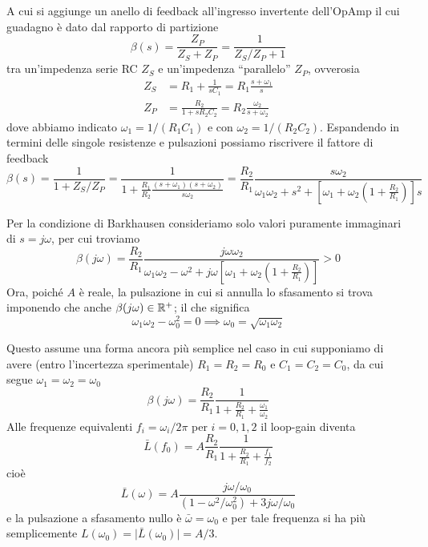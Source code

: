\documentclass[10pt, a4paper, italian]{article}
\begin{document}
A cui si aggiunge un anello di feedback all'ingresso invertente dell'OpAmp
il cui guadagno è dato dal rapporto di partizione
\begin{equation} \label{eq:loop-gain-beta}
\beta(s) = \frac{Z_P}{Z_S + Z_P} = \frac{1}{Z_S/Z_P + 1}
\end{equation}
tra un'impedenza serie RC $Z_S$ e un'impedenza ``parallelo'' $Z_P$, ovverosia
\begin{align*}
Z_S &= R_1 + \frac{1}{s C_1} = R_1 \frac{s + \omega_1}{s} \\
Z_P &= \frac{R_2}{1 + s R_2 C_2} = R_2 \frac{\omega_2}{s + \omega_2}
\end{align*}
dove abbiamo indicato $\omega_1 = 1/(R_1 C_1)$ e con $\omega_2 = 1/(R_2 C_2)$.
Espandendo in termini delle singole resistenze e pulsazioni possiamo riscrivere
il fattore di feedback
\begin{equation}
\beta(s) = \frac{1}{1 + Z_S/Z_P} =
\frac{1}{1 + \frac{R_1}{R_2} \frac{(s + \omega_1)(s + \omega_2)}{s \omega_2}} =
\frac{R_2}{R_1} \frac{s \omega_2}{\omega_1 \omega_2 + s^2 +
\left[\omega_{1} + \omega_{2} \left(1 + \frac{R_2}{R_{1}}\right)\right] s}
\end{equation}

Per la condizione di Barkhausen consideriamo solo valori puramente immaginari
di $s = j\omega$, per cui troviamo
\begin{equation}
\beta(j\omega) = \frac{R_2}{R_1} \frac{j \omega \omega_2}
{\omega_1 \omega_2 - \omega^2 + j \omega
\left[\omega_1 + \omega_2 \left(1 + \frac{R_2}{R_1}\right)\right]} > 0
\end{equation}
Ora, poiché $A$ è reale, la pulsazione in cui si annulla lo sfasamento si
trova imponendo che anche $\beta(j\omega) \in \mathbb R^+$; il che significa
\begin{equation}\label{eq:loop-gain-freq}
\omega_1 \omega_2 - \omega_0^2 = 0 \implies \omega_0 =
\sqrt{\omega_1 \omega_2}
\end{equation}

Questo assume una forma ancora più semplice nel caso in cui supponiamo di avere
(entro l'incertezza sperimentale) $R_1 = R_2 = R_0$ e $ C_1 = C_2 = C_0$,
da cui segue $\omega_1 = \omega_2 = \omega_0$
\[
\beta(j\omega) = \frac{R_2}{R_1} \frac{1}{1 + \frac{R_2}{R_1} + \frac{\omega_1}{\omega_2}}
\]
Alle frequenze equivalenti $f_i = \omega_i/2\pi$ per $i = 0, 1, 2$ il loop-gain
diventa
\[
\bar{L}(f_0) = A \frac{R_2}{R_1} \frac{1}{1 + \frac{R_{2}}{R_{1}} + \frac{f_1}{f_2}}
\]
cioè
\begin{equation} \label{eq:loop-gain-approx}
\bar{L}(\omega) = A \frac{j \omega/\omega_0}{\left(1 - \omega^2/\omega_0^2\right) + 3j \omega/\omega_0}
\end{equation}
e la pulsazione a sfasamento nullo è $ \bar{\omega} = \omega_0 $ e per tale frequenza si ha più semplicemente $L(\omega_0) = \vert{\bar{L}(\omega_0)}\vert =  A / 3 $.
\end{document}
